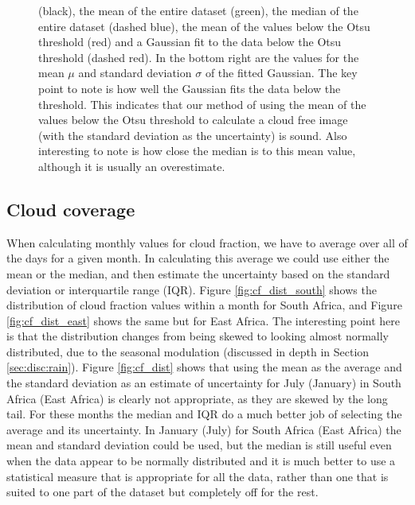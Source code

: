 \begin{figure}
{    (black), the mean of the entire dataset (green), the median of the
    entire dataset (dashed blue), the mean of the values below the
    Otsu threshold (red) and a Gaussian fit to the data below the Otsu
    threshold (dashed red). In the bottom right are the values for the
    mean $\mu$ and standard deviation $\sigma$ of the fitted
    Gaussian. The key point to note is how well the Gaussian fits the
    data below the threshold. This indicates that our method of using
    the mean of the values below the Otsu threshold to calculate a
    cloud free image (with the standard deviation as the uncertainty)
    is sound. Also interesting to note is how close the median is to
    this mean value, although it is usually an overestimate.}
  \label{fig:pix_d}
\end{figure}


\subsection{Cloud coverage}
\label{sec:disc:cc}
When calculating monthly values for cloud fraction, we have to average
over all of the days for a given month. In calculating this average we
could use either the mean or the median, and then estimate the
uncertainty based on the standard deviation or interquartile range
(IQR). Figure \ref{fig:cf_dist_south} shows the distribution of cloud
fraction values within a month for South Africa, and Figure
\ref{fig:cf_dist_east} shows the same but for East Africa. The
interesting point here is that the distribution changes from being
skewed to looking almost normally distributed, due to the seasonal
modulation (discussed in depth in Section \ref{sec:disc:rain}). Figure
\ref{fig:cf_dist} shows that using the mean as the average and the
standard deviation as an estimate of uncertainty for July (January) in
South Africa (East Africa) is clearly not appropriate, as they are
skewed by the long tail. For these months the median and IQR do a much
better job of selecting the average and its uncertainty. In January
(July) for South Africa (East Africa) the mean and standard deviation
could be used, but the median is still useful even when the data
appear to be normally distributed and it is much better to use a
statistical measure that is appropriate for all the data, rather than
one that is suited to one part of the dataset but completely off for
the rest.
